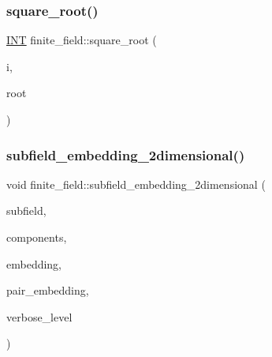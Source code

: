 \subsubsection{\texorpdfstring{square\+\_\+root()}{square\_root()}}
{\footnotesize\ttfamily \mbox{\hyperlink{galois_8h_a09fddde158a3a20bd2dcadb609de11dc}{I\+NT}} finite\+\_\+field\+::square\+\_\+root (\begin{DoxyParamCaption}\item[{\mbox{\hyperlink{galois_8h_a09fddde158a3a20bd2dcadb609de11dc}{I\+NT}}}]{i,  }\item[{\mbox{\hyperlink{galois_8h_a09fddde158a3a20bd2dcadb609de11dc}{I\+NT}} \&}]{root }\end{DoxyParamCaption})}

\mbox{\label{classfinite__field_a645db0a3551afded46e054650631854d}} 
\subsubsection{\texorpdfstring{subfield\+\_\+embedding\+\_\+2dimensional()}{subfield\_embedding\_2dimensional()}}
{\footnotesize\ttfamily void finite\+\_\+field\+::subfield\+\_\+embedding\+\_\+2dimensional (\begin{DoxyParamCaption}\item[{\mbox{\hyperlink{classfinite__field}{finite\+\_\+field}} \&}]{subfield,  }\item[{\mbox{\hyperlink{galois_8h_a09fddde158a3a20bd2dcadb609de11dc}{I\+NT}} $\ast$\&}]{components,  }\item[{\mbox{\hyperlink{galois_8h_a09fddde158a3a20bd2dcadb609de11dc}{I\+NT}} $\ast$\&}]{embedding,  }\item[{\mbox{\hyperlink{galois_8h_a09fddde158a3a20bd2dcadb609de11dc}{I\+NT}} $\ast$\&}]{pair\+\_\+embedding,  }\item[{\mbox{\hyperlink{galois_8h_a09fddde158a3a20bd2dcadb609de11dc}{I\+NT}}}]{verbose\+\_\+level }\end{DoxyParamCaption})}

\mbox{\label{classfinite__field_a0039e9270e296ba8d336894429f254ad}} 

